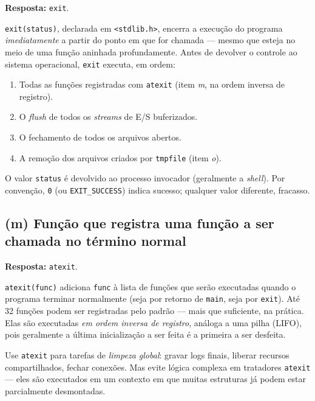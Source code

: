 \documentclass[11pt,a4paper]{article}
\begin{document}
\begin{resposta}\textbf{Resposta:} \texttt{exit}.\end{resposta}

\texttt{exit(status)}, declarada em \texttt{<stdlib.h>}, encerra a execu\c{c}\~ao do programa \emph{imediatamente} a partir do ponto em que for chamada --- mesmo que esteja no meio de uma fun\c{c}\~ao aninhada profundamente. Antes de devolver o controle ao sistema operacional, \texttt{exit} executa, em ordem:

\begin{enumerate}[leftmargin=*, itemsep=0pt]
  \item Todas as fun\c{c}\~oes registradas com \texttt{atexit} (item \emph{m}, na ordem inversa de registro).
  \item O \emph{flush} de todos os \emph{streams} de E/S buferizados.
  \item O fechamento de todos os arquivos abertos.
  \item A remo\c{c}\~ao dos arquivos criados por \texttt{tmpfile} (item \emph{o}).
\end{enumerate}

O valor \texttt{status} \'e devolvido ao processo invocador (geralmente a \emph{shell}). Por conven\c{c}\~ao, \texttt{0} (ou \texttt{EXIT\_SUCCESS}) indica sucesso; qualquer valor diferente, fracasso.

\subsection*{(m) Fun\c{c}\~ao que registra uma fun\c{c}\~ao a ser chamada no t\'ermino normal}

\begin{resposta}\textbf{Resposta:} \texttt{atexit}.\end{resposta}

\texttt{atexit(func)} adiciona \texttt{func} \`a lista de fun\c{c}\~oes que ser\~ao executadas quando o programa terminar normalmente (seja por retorno de \texttt{main}, seja por \texttt{exit}). At\'e 32 fun\c{c}\~oes podem ser registradas pelo padr\~ao --- mais que suficiente, na pr\'atica. Elas s\~ao executadas \emph{em ordem inversa de registro}, an\'aloga a uma pilha (LIFO), pois geralmente a \'ultima inicializa\c{c}\~ao a ser feita \'e a primeira a ser desfeita.

\begin{boaprat}
Use \texttt{atexit} para tarefas de \emph{limpeza global}: gravar logs finais, liberar recursos compartilhados, fechar conex\~oes. Mas evite l\'ogica complexa em tratadores \texttt{atexit} --- eles s\~ao executados em um contexto em que muitas estruturas j\'a podem estar parcialmente desmontadas.
\end{boaprat}
\end{document}
